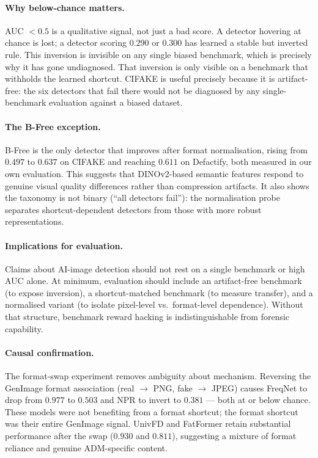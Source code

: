 \documentclass{bmvc2k}
\begin{document}
\paragraph{Why below-chance matters.}
AUC $< 0.5$ is a qualitative signal, not just a bad score. A detector hovering at chance is lost; a detector scoring $0.290$ or $0.300$ has learned a stable but inverted rule. This inversion is invisible on any single biased benchmark, which is precisely why it has gone undiagnosed. That inversion is only visible on a benchmark that withholds the learned shortcut. CIFAKE is useful precisely because it is artifact-free: the six detectors that fail there would not be diagnosed by any single-benchmark evaluation against a biased dataset.

\paragraph{The B-Free exception.}
B-Free is the only detector that improves after format normalisation, rising from $0.497$ to $0.637$ on CIFAKE and reaching $0.611$ on Defactify, both measured in our own evaluation. This suggests that DINOv2-based semantic features respond to genuine visual quality differences rather than compression artifacts. It also shows the taxonomy is not binary (``all detectors fail''): the normalisation probe separates shortcut-dependent detectors from those with more robust representations.

\paragraph{Implications for evaluation.}
Claims about AI-image detection should not rest on a single benchmark or high AUC alone. At minimum, evaluation should include an artifact-free benchmark (to expose inversion), a shortcut-matched benchmark (to measure transfer), and a normalised variant (to isolate pixel-level vs.\ format-level dependence). Without that structure, benchmark reward hacking is indistinguishable from forensic capability.

\paragraph{Causal confirmation.}
The format-swap experiment removes ambiguity about mechanism. Reversing the GenImage format association (real $\to$ PNG, fake $\to$ JPEG) causes FreqNet to drop from $0.977$ to $0.503$ and NPR to invert to $0.381$ --- both at or below chance. These models were not benefiting from a format shortcut; the format shortcut was their entire GenImage signal. UnivFD and FatFormer retain substantial performance after the swap ($0.930$ and $0.811$), suggesting a mixture of format reliance and genuine ADM-specific content.
\end{document}
